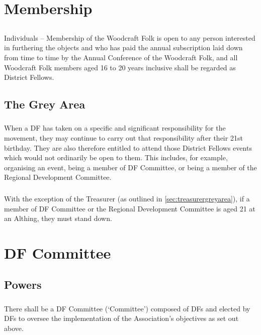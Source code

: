 \documentclass[a4paper, 12pt]{article}
\begin{document}
\section{Membership}
\subsection{}
\label{sec:membership}
Individuals -- Membership of the Woodcraft Folk is open to any person interested in furthering the objects and who has paid the annual subscription laid down from time to time by the Annual Conference of the Woodcraft Folk, and all Woodcraft Folk members aged 16 to 20 years inclusive shall be regarded as District Fellows.
\subsection{The Grey Area}
\label{sec:greyarea}
\subsubsection{}
When a DF has taken on a specific and significant responsibility for the movement, they may continue to carry out that responsibility after their 21st birthday. They are also therefore entitled to attend those District Fellows events which would not ordinarily be open to them. This includes, for example, organising an event, being a member of DF Committee, or being a member of the Regional Development Committee.
\subsubsection{}
With the exception of the Treasurer (as outlined in \ref{sec:treasurergreyarea}), if a member of DF Committee or the Regional Development Committee is aged 21 at an Althing, they must stand down.

\section{DF Committee}
\subsection{Powers}
\subsubsection{}
There shall be a DF Committee (`Committee') composed of DFs and elected by DFs to oversee the implementation of the Association’s objectives as set out above.
\end{document}
